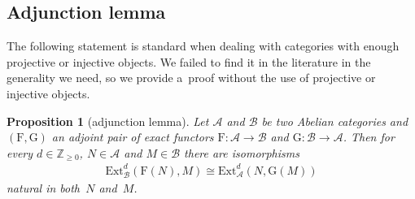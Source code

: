 \documentclass[11pt]{article}
\newtheorem{proposition}{Proposition}
\begin{document}
\subsection{Adjunction lemma}%

The following statement is standard when dealing with categories with enough projective or injective objects.
We failed to f\/ind it in the literature in the generality we need, so we provide a~proof without the use of projective or
injective objects.

\begin{proposition}[adjunction lemma]
\label{adjlem}
Let $\mathcal{A}$ and $\mathcal{B}$ be two Abelian categories and $(\mathrm{F},\mathrm{G})$ an adjoint pair of exact
functors $\mathrm{F}:\mathcal{A}\to \mathcal{B}$ and $\mathrm{G}:\mathcal{B}\to \mathcal{A}$.
Then for every $d\in\mathbb{Z}_{\geq 0}$, $N\in \mathcal{A}$ and $M\in \mathcal{B}$ there are isomorphisms
\begin{gather*}
\mathrm{Ext}^d_{\mathcal{B}}(\mathrm{F}(N),M)\cong \mathrm{Ext}^d_{\mathcal{A}}(N,\mathrm{G}(M))
\end{gather*}
natural in both~$N$ and~$M$.
\end{proposition}
\end{document}
